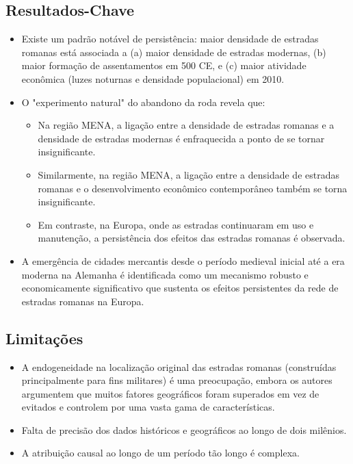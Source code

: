 \documentclass[12pt]{article}
\begin{document}
\subsection*{Resultados-Chave}
\begin{itemize}
    \item Existe um padrão notável de persistência: maior densidade de estradas romanas está associada a (a) maior densidade de estradas modernas, (b) maior formação de assentamentos em 500 CE, e (c) maior atividade econômica (luzes noturnas e densidade populacional) em 2010.
    \item O "experimento natural" do abandono da roda revela que:
    \begin{itemize}
        \item Na região MENA, a ligação entre a densidade de estradas romanas e a densidade de estradas modernas é enfraquecida a ponto de se tornar insignificante.
        \item Similarmente, na região MENA, a ligação entre a densidade de estradas romanas e o desenvolvimento econômico contemporâneo também se torna insignificante.
        \item Em contraste, na Europa, onde as estradas continuaram em uso e manutenção, a persistência dos efeitos das estradas romanas é observada.
    \end{itemize}
    \item A emergência de cidades mercantis desde o período medieval inicial até a era moderna na Alemanha é identificada como um mecanismo robusto e economicamente significativo que sustenta os efeitos persistentes da rede de estradas romanas na Europa.
\end{itemize}

\subsection*{Limitações}
\begin{itemize}
    \item A endogeneidade na localização original das estradas romanas (construídas principalmente para fins militares) é uma preocupação, embora os autores argumentem que muitos fatores geográficos foram superados em vez de evitados e controlem por uma vasta gama de características.
    \item Falta de precisão dos dados históricos e geográficos ao longo de dois milênios.
    \item A atribuição causal ao longo de um período tão longo é complexa.
\end{itemize}
\end{document}
